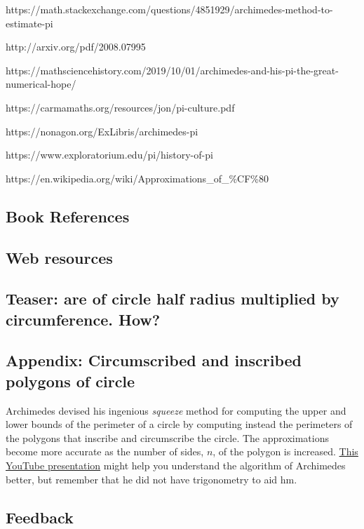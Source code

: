 \documentclass[
  a4paper,
]{article}
\begin{document}
https://math.stackexchange.com/questions/4851929/archimedes-method-to-estimate-pi

http://arxiv.org/pdf/2008.07995

https://mathsciencehistory.com/2019/10/01/archimedes-and-his-pi-the-great-numerical-hope/

https://carmamaths.org/resources/jon/pi-culture.pdf

https://nonagon.org/ExLibris/archimedes-pi

https://www.exploratorium.edu/pi/history-of-pi

https://en.wikipedia.org/wiki/Approximations\_of\_\%CF\%80

\subsection{Book References}\label{book-references}

\subsection{Web resources}\label{web-resources}

\subsection{Teaser: are of circle half radius multiplied by
circumference.
How?}\label{teaser-are-of-circle-half-radius-multiplied-by-circumference.-how}

\subsection{Appendix: Circumscribed and inscribed polygons of
circle}\label{appendix-circumscribed-and-inscribed-polygons-of-circle}

Archimedes devised his ingenious \emph{squeeze} method for computing the
upper and lower bounds of the perimeter of a circle by computing instead
the perimeters of the polygons that inscribe and circumscribe the
circle. The approximations become more accurate as the number of sides,
\(n\), of the polygon is increased.
\href{https://www.youtube.com/watch?v=_qdnyw5Eb_Y}{This YouTube
presentation} might help you understand the algorithm of Archimedes
better, but remember that he did not have trigonometry to aid hm.

\subsection{Feedback}\label{feedback}
\end{document}
